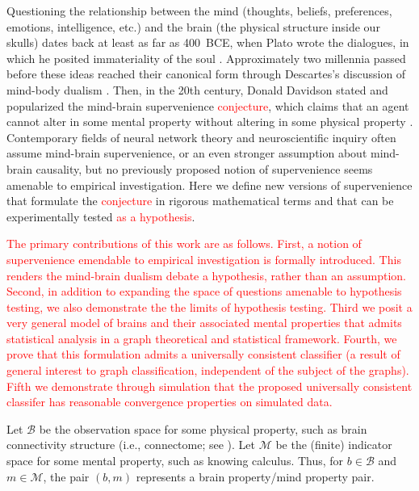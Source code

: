 \documentclass{article}
\newcommand{\mB}{\mathcal{B}}
\newcommand{\mM}{\mathcal{M}}
\providecommand{\tr}[1]{\textcolor{red}{#1}}
\begin{document}
Questioning the relationship between the mind (thoughts, beliefs, preferences, emotions, intelligence, etc.) and the brain (the physical structure inside our skulls) dates back at least as far as 400~BCE, when Plato wrote the dialogues, in which he posited immateriality of the soul \cite{Plato97}. Approximately two millennia passed before these ideas reached their canonical form through Descartes's discussion of mind-body dualism \cite{Descartes1641}. Then, in the 20th century, Donald Davidson stated and popularized the mind-brain supervenience \tr{conjecture}, which claims that an agent cannot alter in some mental property without altering in some physical property \cite{Davidson70}. Contemporary fields of neural network theory and neuroscientific inquiry often assume mind-brain supervenience, or an even stronger assumption about mind-brain causality, but no previously proposed notion of supervenience seems amenable to empirical investigation. Here we define new versions of supervenience that formulate the \tr{conjecture} in rigorous mathematical terms and that can be experimentally tested \tr{as a hypothesis}.

\tr{The primary contributions of this work are as follows.  First, a notion of supervenience emendable to empirical investigation is formally introduced.  This renders the mind-brain dualism debate a hypothesis, rather than an assumption.  Second, in addition to expanding the space of questions amenable to hypothesis testing, we also demonstrate the the limits of hypothesis testing.  Third we posit a very general model of brains and their associated mental properties that admits statistical analysis in a graph theoretical and statistical framework.  Fourth, we prove that this formulation admits a universally consistent classifier (a result of general interest to graph classification, independent of the subject of the graphs).  Fifth we demonstrate through simulation that the proposed universally consistent classifer has reasonable convergence properties on simulated data.}

Let $\mB$ be the observation space for some physical property, such as brain connectivity structure (i.e., connectome; see \cite{SpornsKotter05,LichtmanSanes08,Seung09}). Let $\mM$ be the (finite) indicator space for some mental property, such as knowing calculus. Thus, for $b \in \mB$ and $m \in \mM$, the pair $(b,m)$ represents a brain property/mind property pair.
\end{document}
